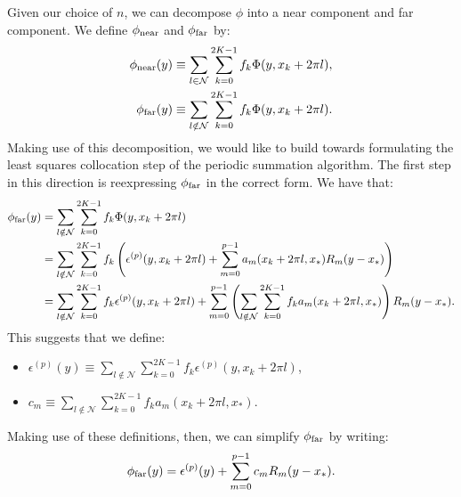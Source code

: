 Given our choice of $n$, we can decompose $\phi$ into a near component
and far component. We define $\phi_{\operatorname{near}}$ and $\phi_{\operatorname{far}}$ by:
\begin{align*}
  \phi_{\operatorname{near}}(y) &\equiv \sum_{l \in \mathcal{N}} \sum_{k=0}^{2K-1} f_k \Phi(y, x_k + 2\pi l), \\
  \phi_{\operatorname{far}}(y) &\equiv \sum_{l \notin \mathcal{N}} \sum_{k=0}^{2K-1} f_k \Phi(y, x_k + 2\pi l).
\end{align*}
Making use of this decomposition, we would like to build towards
formulating the least squares collocation step of the periodic
summation algorithm. The first step in this direction is reexpressing
$\phi_{\operatorname{far}}$ in the correct form. We have that:
\begin{align*}
  \phi_{\operatorname{far}}(y)
  &= \sum_{l \notin \mathcal{N}} \sum_{k=0}^{2K-1} f_k \Phi(y, x_k + 2\pi l) \\
  &= \sum_{l \notin \mathcal{N}} \sum_{k=0}^{2K-1} f_k \left(\epsilon^{(p)}(y, x_k + 2\pi l) + \sum_{m=0}^{p-1} a_m(x_k + 2\pi l, x_*) R_m(y - x_*)\right) \\
  &= \sum_{l \notin \mathcal{N}} \sum_{k=0}^{2K-1} f_k \epsilon^{(p)}(y, x_k + 2\pi l) + \sum_{m=0}^{p-1} \left( \sum_{l \notin \mathcal{N}} \sum_{k=0}^{2K-1} f_k a_m(x_k + 2\pi l, x_*)\right) R_m(y - x_*).
\end{align*}
This suggests that we define:
\begin{itemize}
\item $\epsilon^{(p)}(y) \equiv \sum_{l \notin \mathcal{N}} \sum_{k=0}^{2K-1} f_k \epsilon^{(p)}(y, x_k + 2\pi l)$,
\item $c_m \equiv \sum_{l \notin \mathcal{N}} \sum_{k=0}^{2K-1} f_k a_m(x_k + 2\pi l, x_*)$.
\end{itemize}
Making use of these definitions, then, we can simplify $\phi_{\operatorname{far}}$ by writing:
\begin{align*}
  \phi_{\operatorname{far}}(y) = \epsilon^{(p)}(y) + \sum_{m=0}^{p-1} c_m R_m(y - x_*).
\end{align*}

